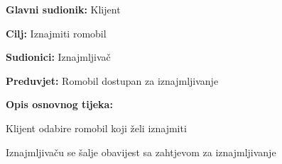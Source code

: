 						\noindent {}
						\begin{packed_item}
							
							\item \textbf{Glavni sudionik: }Klijent
							\item  \textbf{Cilj: }Iznajmiti romobil
							\item  \textbf{Sudionici: }Iznajmljivač
							\item  \textbf{Preduvjet: }Romobil dostupan za iznajmljivanje
							\item  \textbf{Opis osnovnog tijeka:}
							
							\item[] \begin{packed_enum}
								
								\item Klijent odabire romobil koji želi iznajmiti 
								\item Iznajmljivaču se šalje obavijest sa zahtjevom za iznajmljivanje 
								
							\end{packed_enum}
							
						\end{packed_item}
						\noindent {}
